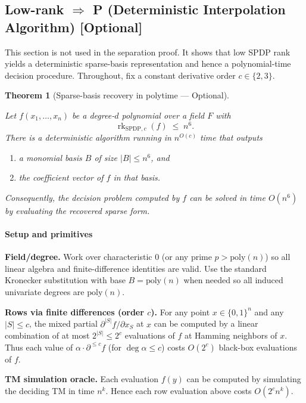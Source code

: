 \documentclass[12pt]{article}
\newtheorem{theorem}{Theorem}
\theoremstyle{definition}
\theoremstyle{definition}
\theoremstyle{remark}
\theoremstyle{remark}
\begin{document}
\subsection{Low-rank $\Rightarrow$ P (Deterministic Interpolation Algorithm) [Optional]}

This section is not used in the separation proof. It shows that low SPDP rank yields a deterministic sparse-basis representation and hence a polynomial-time decision procedure. Throughout, fix a constant derivative order $c \in \{2,3\}$.

\begin{theorem}[Sparse-basis recovery in polytime --- Optional]\label{thm:sparse-basis}

Let $f(x_1, \ldots, x_n)$ be a degree-$d$ polynomial over a field $F$ with
\[
\operatorname{rk}_{\mathrm{SPDP},c}(f) \;\le\; n^6.
\]
There is a deterministic algorithm running in $n^{O(c)}$ time that outputs
\begin{enumerate}
\item a monomial basis $B$ of size $|B| \le n^6$, and
\item the coefficient vector of $f$ in that basis.
\end{enumerate}
Consequently, the decision problem computed by $f$ can be solved in time $O(n^6)$ by evaluating the recovered sparse form.
\end{theorem}

\paragraph{Setup and primitives}

\textbf{Field/degree.} Work over characteristic $0$ (or any prime $p > \mathrm{poly}(n)$) so all linear algebra and finite-difference identities are valid. Use the standard Kronecker substitution with base $B = \mathrm{poly}(n)$ when needed so all induced univariate degrees are $\mathrm{poly}(n)$.

\textbf{Rows via finite differences (order $c$).} For any point $x \in \{0,1\}^n$ and any $|S| \le c$, the mixed partial $\partial^{|S|} f/\partial x_S$ at $x$ can be computed by a linear combination of at most $2^{|S|} \le 2^c$ evaluations of $f$ at Hamming neighbors of $x$. Thus each value of $\alpha \cdot \partial^{\le c} f$ (for $\deg \alpha \le c$) costs $O(2^c)$ black-box evaluations of $f$.

\textbf{TM simulation oracle.} Each evaluation $f(y)$ can be computed by simulating the deciding TM in time $n^k$. Hence each row evaluation above costs $O(2^c n^k)$.
\end{document}
